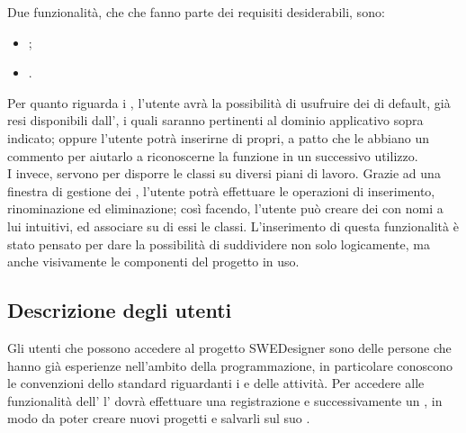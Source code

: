 Due funzionalità, che che fanno parte dei requisiti desiderabili, sono:
	\begin{itemize}
	\item {};
	\item {}.
\end{itemize}

Per quanto riguarda i , l'utente avrà la possibilità di usufruire dei  di default, già resi disponibili dall’, i quali saranno pertinenti al dominio applicativo sopra indicato; oppure l'utente potrà inserirne di propri, a patto che le  abbiano un commento per aiutarlo a riconoscerne la funzione in un successivo utilizzo. \\
I  invece, servono per disporre le classi su diversi piani di lavoro. Grazie ad una finestra di gestione dei , l’utente potrà effettuare le operazioni di inserimento, rinominazione ed eliminazione; così facendo, l’utente può creare dei  con nomi a lui intuitivi, ed associare su di essi le classi. L'inserimento di questa funzionalità è stato pensato per dare la possibilità di suddividere non solo logicamente, ma anche visivamente le componenti del progetto in uso.

\subsection{Descrizione degli utenti}
Gli utenti che possono accedere al progetto SWEDesigner sono delle persone che hanno già esperienze nell'ambito della programmazione, in particolare conoscono le convenzioni dello standard  riguardanti i  e delle attività. 
Per accedere alle funzionalità dell' l' dovrà effettuare una registrazione e successivamente un , in modo da poter creare nuovi progetti e salvarli sul suo .
